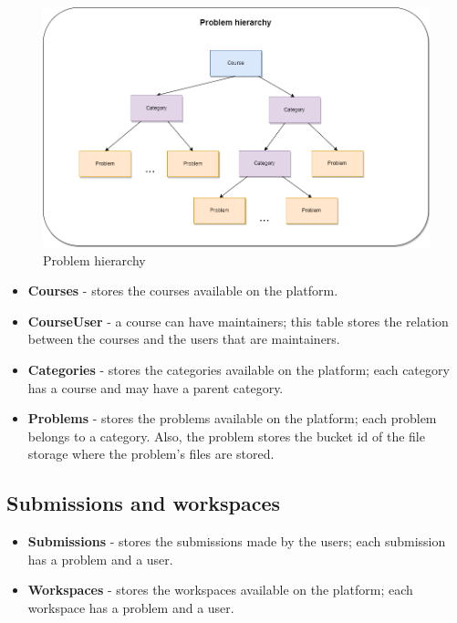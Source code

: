 \documentclass[12pt,a4paper]{report}
\begin{document}
\begin{figure}[h]
	\centering
	\includegraphics[width=\linewidth]{../photos/problem-hierarchy.png}
	\caption{Problem hierarchy}
	\label{fig:problem-hierarchy}
\end{figure}

\begin{itemize}
	\item \textbf{Courses} - stores the courses available on the platform.
	\item \textbf{CourseUser} - a course can have maintainers; this table stores the relation between the courses and the users that are maintainers.
	\item \textbf{Categories} - stores the categories available on the platform; each category has a course and may have a parent category.
	\item \textbf{Problems} - stores the problems available on the platform; each problem belongs to a category. Also, the problem stores the bucket id of the file storage where the problem's files are stored.
\end{itemize}

\subsection{Submissions and workspaces}

\begin{itemize}
	\item \textbf{Submissions} - stores the submissions made by the users; each submission has a problem and a user.
	\item \textbf{Workspaces} - stores the workspaces available on the platform; each workspace has a problem and a user.
\end{itemize}
\end{document}
